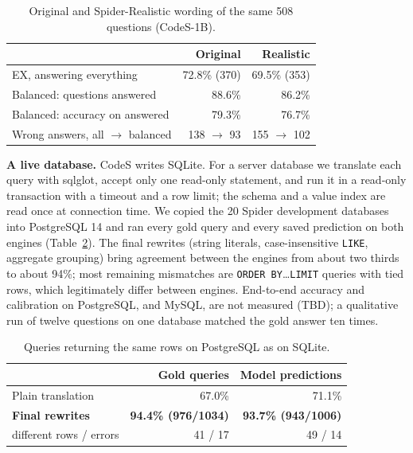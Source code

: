 \documentclass[conference]{IEEEtran}
\begin{document}
\begin{table}[t]
\centering
\caption{Original and Spider-Realistic wording of the same 508 questions (CodeS-1B).}
\label{tab:realistic}
\small\setlength{\tabcolsep}{3pt}
\begin{tabular}{@{}lrr@{}}
\toprule
 & Original & Realistic \\
\midrule
EX, answering everything & 72.8\% (370) & 69.5\% (353) \\
Balanced: questions answered & 88.6\% & 86.2\% \\
Balanced: accuracy on answered & 79.3\% & 76.7\% \\
Wrong answers, all $\to$ balanced & 138 $\to$ 93 & 155 $\to$ 102 \\
\bottomrule
\end{tabular}
\end{table}

\textbf{A live database.} CodeS writes SQLite. For a server database we translate each query with sqlglot, accept only one read-only statement, and run it in a read-only transaction with a timeout and a row limit; the schema and a value index are read once at connection time. We copied the 20 Spider development databases into PostgreSQL 14 and ran every gold query and every saved prediction on both engines (Table~\ref{tab:pg}). The final rewrites (string literals, case-insensitive \texttt{LIKE}, aggregate grouping) bring agreement between the engines from about two thirds to about 94\%; most remaining mismatches are \texttt{ORDER BY}\ldots\texttt{LIMIT} queries with tied rows, which legitimately differ between engines. End-to-end accuracy and calibration on PostgreSQL, and MySQL, are not measured (TBD); a qualitative run of twelve questions on one database matched the gold answer ten times.

\begin{table}[t]
\centering
\caption{Queries returning the same rows on PostgreSQL as on SQLite.}
\label{tab:pg}
\small\setlength{\tabcolsep}{3pt}
\begin{tabular}{@{}lrr@{}}
\toprule
 & Gold queries & Model predictions \\
\midrule
Plain translation & 67.0\% & 71.1\% \\
\textbf{Final rewrites} & \textbf{94.4\% (976/1034)} & \textbf{93.7\% (943/1006)} \\
\quad different rows / errors & 41 / 17 & 49 / 14 \\
\bottomrule
\end{tabular}
\end{table}
\end{document}
